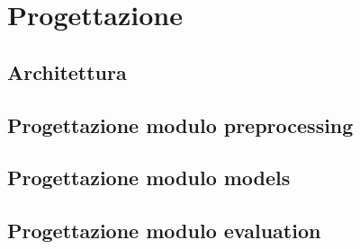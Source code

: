 \chapter{Progettazione}

\section{Architettura}

\section{Progettazione modulo preprocessing}

\section{Progettazione modulo models}

\section{Progettazione modulo evaluation}
